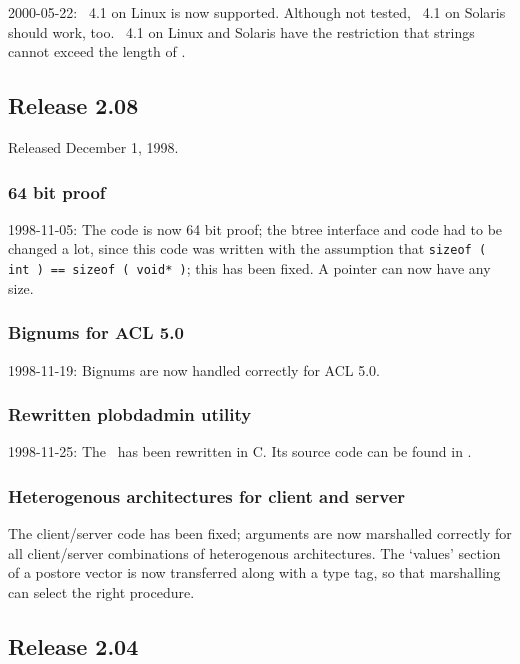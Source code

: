 2000-05-22: \lwcl\ 4.1 on Linux is now supported. Although not tested,
\lwcl\ 4.1 on Solaris should work, too. \lwcl\ 4.1 on Linux and
Solaris have the restriction that strings cannot exceed the length of
.

\subsection{Release 2.08}

Released December 1, 1998.

\subsubsection{64 bit proof}

1998-11-05: The code is now 64 bit proof; the btree interface and code
had to be changed a lot, since this code was written with the
assumption that \texttt{sizeof ( int )}\ \texttt{==}\ \texttt{sizeof (
  void* )}; this has been fixed. A pointer can now have any size.

\subsubsection{Bignums for ACL 5.0}

1998-11-19: Bignums are now handled correctly for ACL 5.0.

\subsubsection{Rewritten plobdadmin utility}

1998-11-25: The \ has been rewritten in C. Its source
code can be found in .

\subsubsection{Heterogenous architectures for client and server}

The client/server code has been fixed; arguments are now marshalled
correctly for all client/server combinations of heterogenous
architectures. The `values' section of a postore vector is now
transferred along with a type tag, so that marshalling can select the
right procedure.

\subsection{Release 2.04}

